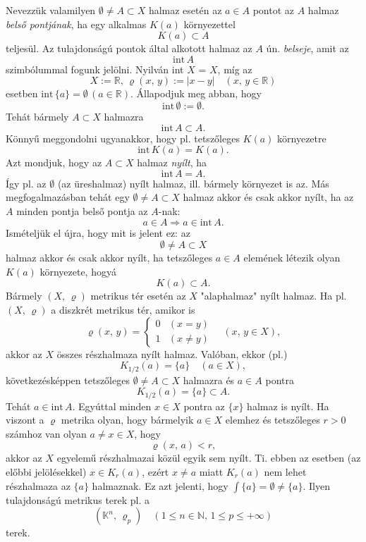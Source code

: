 \documentclass[12pt]{article}
\newcommand{\R}{\mathbb{R}}
\newcommand{\N}{\mathbb{N}}
\newcommand{\K}{\mathbb{K}}
\begin{document}
    Nevezzük valamilyen $\emptyset \neq A \subset X$ halmaz esetén az $a \in A$ pontot az $A$ halmaz \textit{belső pontjának}, ha egy alkalmas $K(a)$ környezettel
    \[
        K(a) \subset A
    \]
    teljesül. Az tulajdonságú pontok által alkotott halmaz az $A$ ún. \textit{belseje}, amit az
    \[
        \text{int} \, A
    \]
    szimbólummal fogunk jelölni. Nyilván int $X$ = $X$, míg az
    \[
        X := \R, \, \varrho(x, \, y) := |x-y| \quad (x, \, y \in \R)
    \]
    esetben $\text{int} \, \{a\} = \emptyset \, (a \in \R)$. Állapodjuk meg abban, hogy
    \[
        \text{int} \, \emptyset := \emptyset.
    \]
    Tehát bármely $A \subset X$ halmazra
    \[
        \text{int} \, A \subset A.
    \]
    Könnyű meggondolni ugyanakkor, hogy pl. tetszőleges $K(a)$ környezetre
    \[
        \text{int} \, K(a) = K(a).
    \]
    Azt mondjuk, hogy az $A \subset X$ halmaz \textit{nyílt}, ha
    \[
        \text{int} \, A = A.
    \]
    Így pl. az $\emptyset$ (az üreshalmaz) nyílt halmaz, ill. bármely környezet is az. Más megfogalmazásban tehát egy $\emptyset \neq A \subset X$ halmaz akkor és csak akkor nyílt, ha az $A$ minden pontja belső pontja az $A$-nak:
    \[
        a \in A \Longrightarrow a \in \text{int} \, A.
    \]
    Ismételjük el újra, hogy mit is jelent ez: az
    \[
        \emptyset \neq A \subset X
    \]
    halmaz akkor és csak akkor nyílt, ha tetszőleges $a \in A$ elemének létezik olyan $K(a)$ környezete, hogyá
    \[
        K(a) \subset A.
    \]
    Bármely $(X, \, \varrho)$ metrikus tér esetén az $X$ "alaphalmaz" nyílt halmaz. Ha pl. $(X, \, \varrho)$ a diszkrét metrikus tér, amikor is
    \[
        \varrho(x, \, y) =
        \begin{cases}
            0 & (x = y) \\
            1 & (x \neq y)
        \end{cases}
        \quad (x, \, y \in X),
    \]
    akkor az $X$ összes részhalmaza nyílt halmaz. Valóban, ekkor (pl.)
    \[
        K_{1/2}(a) = \{a\} \quad (a \in X),
    \]
    következésképpen tetszőleges $\emptyset \neq A \subset X$ halmazra és $a \in A$ pontra
    \[
        K_{1/2}(a) = \{a\} \subset A.
    \]
    Tehát $a \in \text{int} \, A$. Egyúttal minden $x \in X$ pontra az $\{x\}$ halmaz is nyílt. Ha viszont a $\varrho$ metrika olyan, hogy bármelyik $a \in X$ elemhez és tetszőleges $r > 0$ számhoz van olyan $a \neq x \in X$, hogy
    \[
        \varrho(x, \, a) < r,
    \]
    akkor az $X$ egyelemű részhalmazai közül egyik sem nyílt. Ti. ebben az esetben (az előbbi jelölésekkel) $x \in K_r(a)$, ezért $x \neq a$ miatt $K_r(a)$ nem lehet részhalmaza az $\{a\}$ halmaznak. Ez azt jelenti, hogy $\int \{a \} = \emptyset \neq \{a\}$. Ilyen tulajdonságú metrikus terek pl. a
    \[
        (\K^n, \, \varrho_p) \quad (1 \leq n \in \N, \, 1 \leq p \leq + \infty)
    \]
    terek.\\
\end{document}
